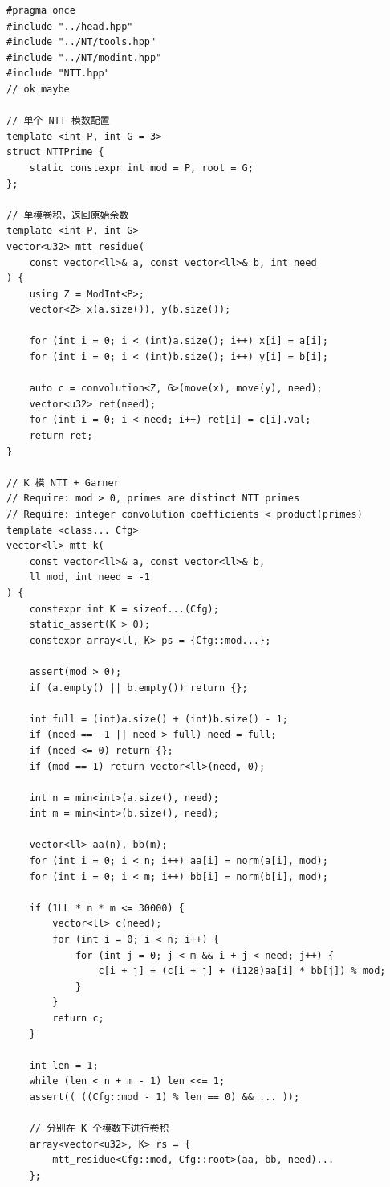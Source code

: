 \begin{lstlisting}
#pragma once
#include "../head.hpp"
#include "../NT/tools.hpp"
#include "../NT/modint.hpp"
#include "NTT.hpp"
// ok maybe

// 单个 NTT 模数配置
template <int P, int G = 3>
struct NTTPrime {
    static constexpr int mod = P, root = G;
};

// 单模卷积，返回原始余数
template <int P, int G>
vector<u32> mtt_residue(
    const vector<ll>& a, const vector<ll>& b, int need
) {
    using Z = ModInt<P>;
    vector<Z> x(a.size()), y(b.size());

    for (int i = 0; i < (int)a.size(); i++) x[i] = a[i];
    for (int i = 0; i < (int)b.size(); i++) y[i] = b[i];

    auto c = convolution<Z, G>(move(x), move(y), need);
    vector<u32> ret(need);
    for (int i = 0; i < need; i++) ret[i] = c[i].val;
    return ret;
}

// K 模 NTT + Garner
// Require: mod > 0, primes are distinct NTT primes
// Require: integer convolution coefficients < product(primes)
template <class... Cfg>
vector<ll> mtt_k(
    const vector<ll>& a, const vector<ll>& b,
    ll mod, int need = -1
) {
    constexpr int K = sizeof...(Cfg);
    static_assert(K > 0);
    constexpr array<ll, K> ps = {Cfg::mod...};

    assert(mod > 0);
    if (a.empty() || b.empty()) return {};

    int full = (int)a.size() + (int)b.size() - 1;
    if (need == -1 || need > full) need = full;
    if (need <= 0) return {};
    if (mod == 1) return vector<ll>(need, 0);

    int n = min<int>(a.size(), need);
    int m = min<int>(b.size(), need);

    vector<ll> aa(n), bb(m);
    for (int i = 0; i < n; i++) aa[i] = norm(a[i], mod);
    for (int i = 0; i < m; i++) bb[i] = norm(b[i], mod);

    if (1LL * n * m <= 30000) {
        vector<ll> c(need);
        for (int i = 0; i < n; i++) {
            for (int j = 0; j < m && i + j < need; j++) {
                c[i + j] = (c[i + j] + (i128)aa[i] * bb[j]) % mod;
            }
        }
        return c;
    }

    int len = 1;
    while (len < n + m - 1) len <<= 1;
    assert(( ((Cfg::mod - 1) % len == 0) && ... ));

    // 分别在 K 个模数下进行卷积
    array<vector<u32>, K> rs = {
        mtt_residue<Cfg::mod, Cfg::root>(aa, bb, need)...
    };


\end{lstlisting}
